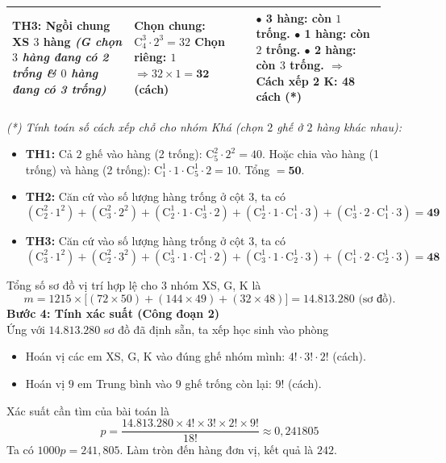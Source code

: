 \begin{ex}
{\begin{center}
\begin{tabular}{|p{0.3\linewidth}|p{0.3\linewidth}|p{0.32\linewidth}|}
				\textbf{TH3: Ngồi chung XS $3$ hàng} \newline
				\textit{(G chọn $3$ hàng đang có 2 trống \newline \& $0$ hàng đang có 3 trống)}
				& Chọn chung: $\mathrm{C}_4^3 \cdot 2^3 = 32$ \newline
				Chọn riêng: $1$ \newline
				$\Rightarrow 32 \times 1 = \mathbf{32}$ (cách)
				& $\bullet$ \textbf{3 hàng:} còn $1$ trống. \newline
				$\bullet$ \textbf{1 hàng:} còn $2$ trống. \newline
				$\bullet$ \textbf{2 hàng:} còn $3$ trống. \newline
				$\Rightarrow$ Cách xếp 2 K: \textbf{48 cách (*)} \\ \hline
			\end{tabular}
		\end{center}
		\textit{(*) Tính toán số cách xếp chỗ cho nhóm Khá (chọn $2$ ghế ở $2$ hàng khác nhau):}
		\begin{itemize}
			\item \textbf{TH1:} Cả $2$ ghế vào hàng (2 trống): $\mathrm{C}_5^2 \cdot 2^2 = 40$. Hoặc chia vào hàng (1 trống) và hàng (2 trống): $\mathrm{C}_1^1 \cdot 1 \cdot \mathrm{C}_5^1 \cdot 2 = 10$. Tổng $= \mathbf{50}$.
			\item \textbf{TH2:} Căn cứ vào số lượng hàng trống ở cột 3, ta có $$(\mathrm{C}_2^2 \cdot 1^2) + (\mathrm{C}_3^2 \cdot 2^2) + (\mathrm{C}_2^1 \cdot 1 \cdot \mathrm{C}_3^1 \cdot 2) + (\mathrm{C}_2^1 \cdot 1 \cdot \mathrm{C}_1^1 \cdot 3) + (\mathrm{C}_3^1 \cdot 2 \cdot \mathrm{C}_1^1 \cdot 3) = \mathbf{49}$$
			\item \textbf{TH3:} Căn cứ vào số lượng hàng trống ở cột 3, ta có $$(\mathrm{C}_3^2 \cdot 1^2) + (\mathrm{C}_2^2 \cdot 3^2) + (\mathrm{C}_3^1 \cdot 1 \cdot \mathrm{C}_1^1 \cdot 2) + (\mathrm{C}_3^1 \cdot 1 \cdot \mathrm{C}_2^1 \cdot 3) + (\mathrm{C}_1^1 \cdot 2 \cdot \mathrm{C}_2^1 \cdot 3) = \mathbf{48}$$
		\end{itemize}
		
		Tổng số sơ đồ vị trí hợp lệ cho $3$ nhóm XS, G, K là
		$$m = 1215 \times \Big[ (72 \times 50) + (144 \times 49) + (32 \times 48) \Big] = \mathbf{14.813.280} \text{ (sơ đồ)}.$$
		\textbf{Bước 4: Tính xác suất (Công đoạn 2)}\\
		Ứng với $14.813.280$ sơ đồ đã định sẵn, ta xếp học sinh vào phòng
		\begin{itemize}
			\item Hoán vị các em XS, G, K vào đúng ghế nhóm mình: $4! \cdot 3! \cdot 2!$ (cách).
			\item Hoán vị $9$ em Trung bình vào $9$ ghế trống còn lại: $9!$ (cách).
		\end{itemize}
		Xác suất cần tìm của bài toán là
		$$p = \dfrac{14.813.280 \times 4! \times 3! \times 2! \times 9!}{18!} \approx 0,241805$$
		Ta có $1000p = 241,805$. Làm tròn đến hàng đơn vị, kết quả là $\boxed{242}$.
	}
\end{ex}